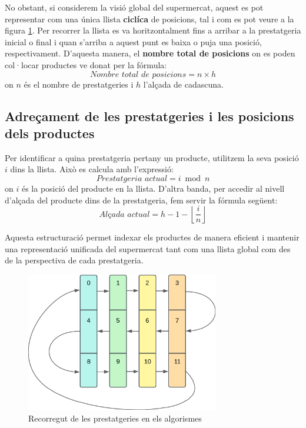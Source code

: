 \documentclass[a4paper,12pt]{report}
\begin{document}
No obstant, si considerem la visió global del supermercat, aquest es pot representar com una única llista \textbf{ciclíca} de posicions, tal i com es pot veure a la figura \ref{fig:shelving_array}. Per recorrer la llista es va horitzontalment fins a arribar a la prestatgeria inicial o final i quan s'arriba a aquest punt es baixa o puja una posició, respectivament.
D'aquesta manera, el \textbf{nombre total de posicions} on es poden col·locar productes ve donat per la fórmula:
\[
	\textit{Nombre total de posicions} = n \times h
\]
on \( n \) és el nombre de prestatgeries i \( h \) l'alçada de cadascuna.

\subsection{Adreçament de les prestatgeries i les posicions dels productes}

Per identificar a quina prestatgeria pertany un producte, utilitzem la seva posició \( i \) dins la llista. Això es calcula amb l'expressió:
\[
	\textit{Prestatgeria actual} = i \bmod n
\]
on \( i \) és la posició del producte en la llista.
\newline
D'altra banda, per accedir al nivell d'alçada del producte dins de la prestatgeria, fem servir la fórmula següent:
\[
	\textit{Alçada actual} = h - 1 - \left\lfloor \frac{i}{n} \right\rfloor
\]

Aquesta estructuració permet indexar els productes de manera eficient i mantenir una representació unificada del supermercat tant com una llista global com des de la perspectiva de cada prestatgeria.


\begin{figure}[H]
	\centering
	\includegraphics[width=0.75\textwidth]{../assets/shelvingUnit_array_diagram.png}
	\caption{Recorregut de les prestatgeries en els algorismes}
	\label{fig:shelving_array}
\end{figure}
\end{document}
